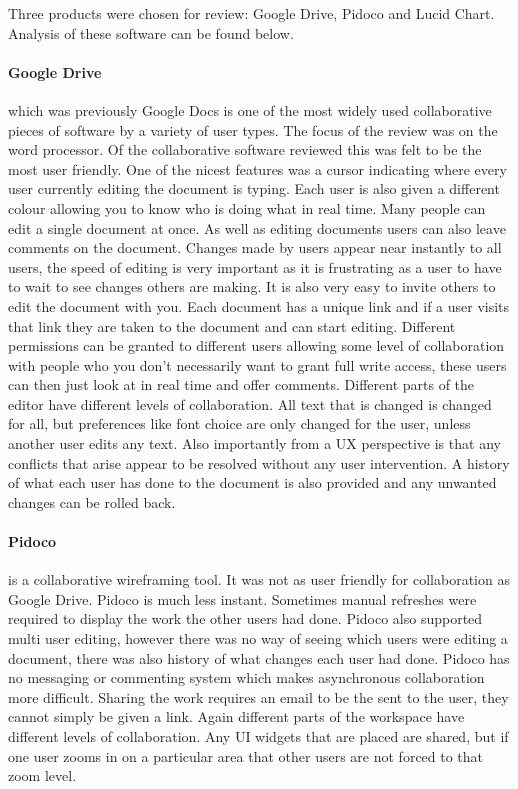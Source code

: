 Three products were chosen for review: Google Drive, Pidoco and Lucid Chart.  Analysis of these software can be found below.

\paragraph{Google Drive} which was previously Google Docs is one of the most widely used collaborative pieces of software by a variety of user types.  The focus of the review was on the word processor.  Of the collaborative software reviewed this was felt to be the most user friendly.  One of the nicest features was a cursor indicating where every user currently editing the document is typing. Each user is also given a different colour allowing you to know who is doing what in real time.  Many people can edit a single document at once.  As well as editing documents users can also leave comments on the document.  Changes made by users appear near instantly to all users, the speed of editing is very important as it is frustrating as a user to have to wait to see changes others are making.  It is also very easy to invite others to edit the document with you.  Each document has a unique link and if a user visits that link they are taken to the document and can start editing.  Different permissions can be granted to different users allowing some level of collaboration with people who you don't necessarily want to grant full write access, these users can then just look at in real time and offer comments.  Different parts of the editor have different levels of collaboration.  All text that is changed is changed for all, but preferences like font choice are only changed for the user, unless another user edits any text.  Also importantly from a \ac{UX} perspective is that any conflicts that arise appear to be resolved without any user intervention.  A history of what each user has done to the document is also provided and any unwanted changes can be rolled back.

\paragraph{Pidoco} is a collaborative wireframing tool.  It was not as user friendly for collaboration as Google Drive.  Pidoco is much less instant.  Sometimes manual refreshes were required to display the work the other users had done.  Pidoco also supported multi user editing, however there was no way of seeing which users were editing a document, there was also history of what changes each user had done.  Pidoco has no messaging or commenting system which makes asynchronous collaboration more difficult.  Sharing the work requires an email to be the sent to the user, they cannot simply be given a link.  Again different parts of the workspace have different levels of collaboration.  Any \ac{UI} widgets that are placed are shared, but if one user zooms in on a particular area that other users are not forced to that zoom level.

